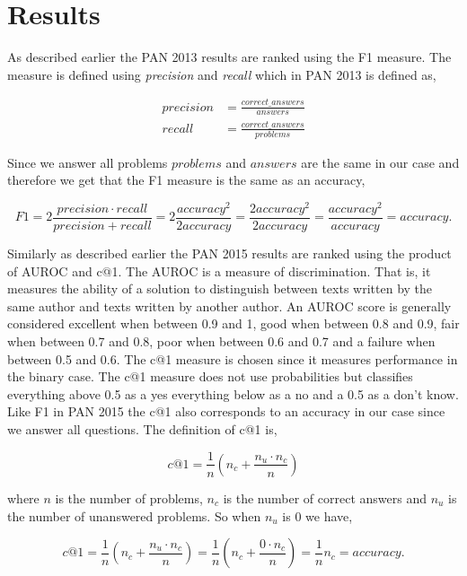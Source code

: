 \section{Results} \label{sec:results}
As described earlier the PAN 2013 results are ranked using the F1 measure. The
measure is defined using \textit{precision} and \textit{recall} which in PAN
2013 is defined as,

\begin{align}
    precision &=  \frac{correct\_answers}{answers} \\[1em]
    recall &= \frac{correct\_answers}{problems}
\end{align}

Since we answer all problems $problems$ and $answers$ are the same in our case
and therefore we get that the F1 measure is the same as an accuracy,

\begin{equation}
    F1 = 2 \frac{precision \cdot recall}{precision + recall}
        = 2 \frac{accuracy^2}{2accuracy}
        = \frac{2accuracy^2}{2accuracy}
        = \frac{accuracy^2}{accuracy}
        = accuracy.
\end{equation}

Similarly as described earlier the PAN 2015 results are ranked using the product
of \gls{AUROC} and c@1. The \gls{AUROC} is a measure of discrimination. That
is, it measures the ability of a solution to distinguish between texts written
by the same author and texts written by another author. An \gls{AUROC} score is
generally considered excellent when between 0.9 and 1, good when between 0.8
and 0.9, fair when between 0.7 and 0.8, poor when between 0.6 and 0.7 and a
failure when between 0.5 and 0.6. The c@1 measure is chosen since it measures
performance in the binary case. The c@1 measure does not use probabilities but
classifies everything above 0.5 as a yes everything below as a no and a 0.5 as a
don't know. Like F1 in PAN 2015 the c@1 also corresponds to an accuracy in our
case since we answer all questions. The definition of c@1 is,

\begin{equation}
    c@1 = \frac{1}{n} \left(n_c + \frac{n_u \cdot n_c}{n}\right)
\end{equation}

where $n$ is the number of problems, $n_c$ is the number of correct answers and
$n_u$ is the number of unanswered problems. So when $n_u$ is 0 we have,

\begin{equation}
    c@1 = \frac{1}{n} \left(n_c + \frac{n_u \cdot n_c}{n}\right)
        = \frac{1}{n} \left(n_c + \frac{0 \cdot n_c}{n}\right)
        = \frac{1}{n} n_c
        = accuracy.
\end{equation}

